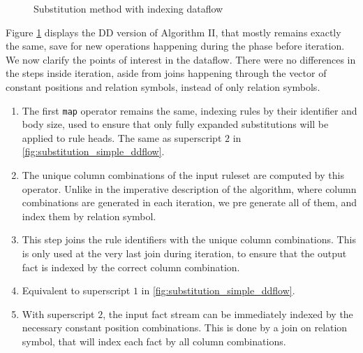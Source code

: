 \documentclass[sigconf,screen,review=false,natbib]{acmart}
\theoremstyle{definition}
\begin{document}
\begin{figure}
	\caption{Substitution method with indexing dataflow}
	\label{fig:substitution_indexed_ddflow}
\end{figure}
Figure \ref{fig:substitution_indexed_ddflow} displays the DD version of Algorithm II, that mostly remains exactly the same, save for
new operations happening during the phase before iteration. We now clarify the points of interest in the dataflow. There were no differences in the steps inside
iteration, aside from joins happening through the vector of constant positions and relation symbols,
instead of only relation symbols.
\begin{enumerate}
	\item The first \verb|map| operator remains the same, indexing rules by their identifier and body size, used to ensure
	      that only fully expanded substitutions will be applied to rule heads. The same as superscript $2$ in \ref{fig:substitution_simple_ddflow}.
	\item The unique column combinations of the input ruleset are computed by this operator. Unlike in the imperative description of the algorithm, where
	      column combinations are generated in each iteration, we pre generate all of them, and index them by relation symbol.
	\item This step joins the rule identifiers with the unique column combinations. This is only used at the very last join during iteration, to ensure that
	      the output fact is indexed by the correct column combination.
	\item Equivalent to superscript $1$ in \ref{fig:substitution_simple_ddflow}.
	\item With superscript $2$, the input fact stream can be immediately indexed by the necessary constant position combinations. This is done by a join on
	      relation symbol, that will index each fact by all column combinations.
\end{enumerate}
\end{document}
